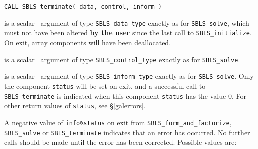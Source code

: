 \documentclass{galahad}
\newcommand{\packagename}{SBLS}
\begin{document}
\hspace{8mm}
{\tt CALL \packagename\_terminate( data, control, inform )}

\begin{description}

 is a scalar \intentinout\ argument of type
{\tt \packagename\_data\_type}
exactly as for
{\tt \packagename\_solve},
which must not have been altered {\bf by the user} since the last call to
{\tt \packagename\_initialize}.
On exit, array components will have been deallocated.

 is a scalar \intentin\ argument of type
{\tt \packagename\_control\_type}
exactly as for
{\tt \packagename\_solve}.

 is a scalar \intentout\ argument of type
{\tt \packagename\_inform\_type}
exactly as for
{\tt \packagename\_solve}.
Only the component {\tt status} will be set on exit, and a
successful call to
{\tt \packagename\_terminate}
is indicated when this  component {\tt status} has the value 0.
For other return values of {\tt status}, see \S\ref{galerrors}.

\end{description}


\galerrors
A negative value of {\tt info\%status} on exit from
{\tt \packagename\_form\_and\_factorize},
{\tt \packagename\_solve}
or
{\tt \packagename\_terminate}
indicates that an error has occurred. No further calls should be made
until the error has been corrected. Possible values are:
\end{document}
